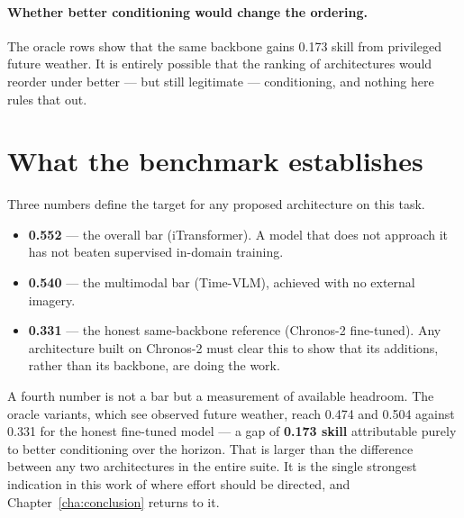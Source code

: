 \paragraph{Whether better conditioning would change the ordering.} The oracle rows show that
the same backbone gains 0.173 skill from privileged future weather. It is entirely possible
that the ranking of architectures would reorder under better --- but still legitimate ---
conditioning, and nothing here rules that out.

\section{What the benchmark establishes}
\label{sec:bar}

Three numbers define the target for any proposed architecture on this task.

\begin{itemize}
  \item \textbf{0.552} --- the overall bar (iTransformer). A model that does not approach it
    has not beaten supervised in-domain training.
  \item \textbf{0.540} --- the multimodal bar (Time-VLM), achieved with no external imagery.
  \item \textbf{0.331} --- the honest same-backbone reference (Chronos-2 fine-tuned). Any
    architecture built on Chronos-2 must clear this to show that its additions, rather than
    its backbone, are doing the work.
\end{itemize}

A fourth number is not a bar but a measurement of available headroom. The oracle variants,
which see observed future weather, reach 0.474 and 0.504 against 0.331 for the honest
fine-tuned model --- a gap of \textbf{0.173 skill} attributable purely to better conditioning
over the horizon. That is larger than the difference between any two architectures in the
entire suite. It is the single strongest indication in this work of where effort should be
directed, and Chapter~\ref{cha:conclusion} returns to it.

\par

